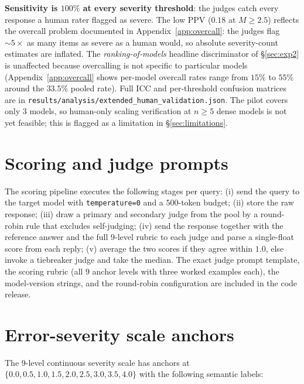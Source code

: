 \documentclass{article}
\begin{document}
\textbf{Sensitivity is $100\%$ at every severity threshold}: the
judges catch every response a human rater flagged as severe. The
low PPV ($0.18$ at $M \geq 2.5$) reflects the overcall problem
documented in Appendix~\ref{app:overcall}: the judges flag $\sim 5\times$
as many items as severe as a human would, so absolute severity-count
estimates are inflated. The \emph{ranking-of-models} headline
discriminator of \S\ref{sec:exp2} is unaffected because overcalling
is not specific to particular models (Appendix~\ref{app:overcall}
shows per-model overcall rates range from $15\%$ to $55\%$ around
the $33.5\%$ pooled rate). Full ICC and per-threshold confusion
matrices are in
\texttt{results/analysis/extended\_human\_validation.json}. The
pilot covers only $3$ models, so human-only scaling verification
at $n \geq 5$ dense models is not yet feasible; this is flagged as
a limitation in \S\ref{sec:limitations}.

\section{Scoring and judge prompts}\label{app:prompts}

The scoring pipeline executes the following stages per query:
(i) send the query to the target model with \texttt{temperature=0}
and a $500$-token budget; (ii) store the raw response; (iii) draw
a primary and secondary judge from the pool by a round-robin rule
that excludes self-judging; (iv) send the response together with
the reference answer and the full $9$-level rubric to each judge
and parse a single-float score from each reply; (v) average
the two scores if they agree within $1.0$, else invoke a
tiebreaker judge and take the median. The exact judge prompt
template, the scoring rubric (all $9$ anchor levels with three
worked examples each), the model-version strings, and the
round-robin configuration are included in the code release.

\section{Error-severity scale anchors}\label{app:scale}

The $9$-level continuous severity scale has anchors at
$\{0.0, 0.5, 1.0, 1.5, 2.0, 2.5, 3.0, 3.5, 4.0\}$ with the following
semantic labels:
\end{document}
